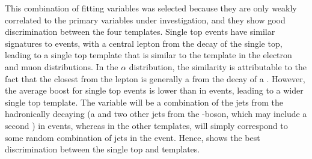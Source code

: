 This combination of fitting variables was selected because they are only weakly correlated to the primary
variables under investigation, and they show good discrimination between the four templates.
Single top events have similar signatures to \ttbar events, with a central lepton from the decay of the single
top, leading to a single top template that is similar to the \ttbar template in the electron \abseta and muon
\abseta distributions. In the $\alpha$ distribution, the similarity is attributable to the fact that the
closest \bjet from the lepton is generally a \bjet from the decay of a \tquark. However, the average boost for
single top events is lower than in \ttbar events, leading to a wider single top template.
The \Mthree variable will be a combination of the jets from the hadronically decaying \tquark (a \bjet and two
other jets from the \W-boson, which may include a second \bjet) in \ttbar events, whereas in the other
templates, \Mthree will simply correspond to some random combination of jets in the event. Hence, \Mthree shows the
best discrimination between the single top and \ttbar templates.


